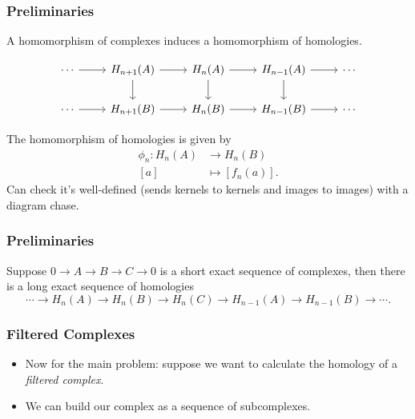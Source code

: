 \documentclass{beamer}
\begin{document}
\begin{frame}[fragile]
	\frametitle{Preliminaries}

        \begin{theorem}
                A homomorphism of complexes induces a homomorphism of homologies.
        \end{theorem}
	\[
        \begin{tikzcd}
		\cdots \rar & H_{n+1}(A) \dar\arrow[r] & H_{n}(A) \arrow[r]\arrow[d] & H_{n-1}(A) \arrow[r] \arrow[d]& \cdots \\
		\cdots \rar & H_{n+1}(B) \arrow[r] & H_n(B) \arrow[r] & H_{n-1}(B) \arrow[r] & \cdots
        \end{tikzcd}
        \]
\end{frame}

\begin{frame}[fragile]
	The homomorphism of homologies is given by
	\begin{align*}
		\phi_{n}:H_n(A)&\to H_n(B)\\
		[a]&\mapsto [f_n(a)].
	\end{align*}
	Can check it's well-defined (sends kernels to kernels and images to images) with a diagram chase.
\end{frame}

\begin{frame}
	\frametitle{Preliminaries}

	\begin{theorem}
	Suppose $0\to A\to B\to C\to 0$ is a short exact sequence of complexes, then there is a long exact sequence of homologies
	\[
        \cdots \to H_{n}(A)\to H_{n}(B) \to H_{n}(C) \to H_{n-1}(A) \to H_{n-1}(B) \to  \cdots.
	\]
	\end{theorem}
\end{frame}



\begin{frame}
	\frametitle{Filtered Complexes}

	\begin{itemize}
		\item Now for the main problem: suppose we want to calculate the homology of a \textit{filtered complex}.
		\item We can build our complex as a sequence of subcomplexes.
	\end{itemize}
\end{frame}
\end{document}
